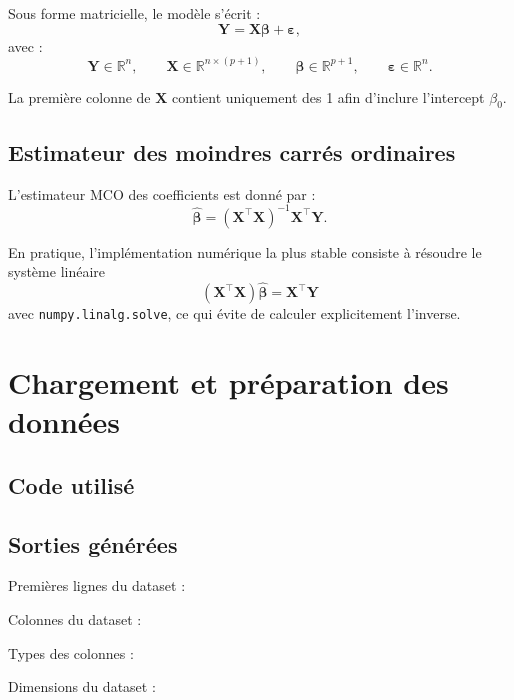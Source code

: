 \documentclass[12pt,letterpaper]{article}
\begin{document}
Sous forme matricielle, le modèle s'écrit :
\[
\mathbf{Y} = \mathbf{X}\boldsymbol{\beta} + \boldsymbol{\varepsilon},
\]
avec :
\[
\mathbf{Y} \in \mathbb{R}^n,\qquad
\mathbf{X} \in \mathbb{R}^{n \times (p+1)},\qquad
\boldsymbol{\beta} \in \mathbb{R}^{p+1},\qquad
\boldsymbol{\varepsilon} \in \mathbb{R}^n.
\]

La première colonne de $\mathbf{X}$ contient uniquement des 1 afin d'inclure l'intercept $\beta_0$.

\subsection{Estimateur des moindres carrés ordinaires}

L'estimateur MCO des coefficients est donné par :
\[
\hat{\boldsymbol{\beta}} = (\mathbf{X}^\top \mathbf{X})^{-1}\mathbf{X}^\top \mathbf{Y}.
\]

En pratique, l'implémentation numérique la plus stable consiste à résoudre le système linéaire
\[
(\mathbf{X}^\top \mathbf{X})\hat{\boldsymbol{\beta}} = \mathbf{X}^\top \mathbf{Y}
\]
avec \texttt{numpy.linalg.solve}, ce qui évite de calculer explicitement l'inverse.

\section{Chargement et préparation des données}

\subsection{Code utilisé}



\subsection{Sorties générées}

Premières lignes du dataset :


Colonnes du dataset :


Types des colonnes :


Dimensions du dataset :

\end{document}
